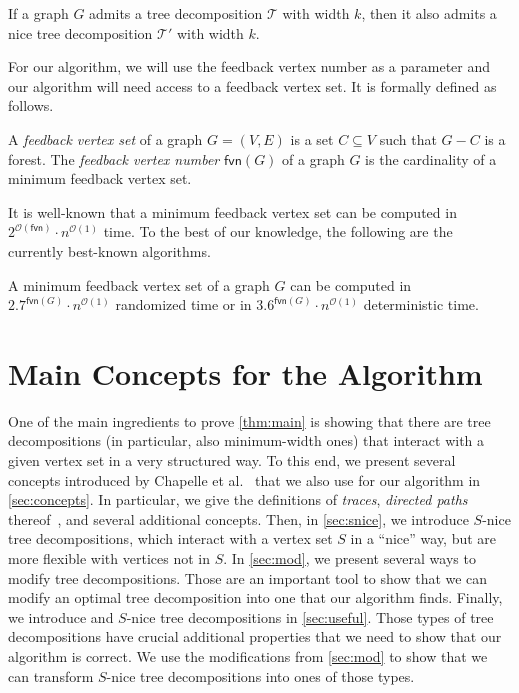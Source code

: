 \documentclass[a4paper,UKenglish,cleveref, autoref, thm-restate, numberwithinsect]{lipics-v2021}
\newcounter{modification}
\newcounter{algorithm}
\newcommand{\OO}{\mathcal{O}}
\newcommand{\fvn}{\mathsf{fvn}}
\newcommand{\slim}{\text{slim}\xspace}
\newcommand{\topheavy}{\text{top-heavy}\xspace}
\begin{document}
\begin{lemma}\label{lem:nicetd}
    If a graph $G$ admits a tree decomposition $\mathcal{T}$ with width $k$, then it also admits a nice tree decomposition $\mathcal{T}'$ with width $k$.
\end{lemma}

For our algorithm, we will use the feedback vertex number as a parameter and our algorithm will need access to a feedback vertex set. It is formally defined as follows.

\begin{definition}
    A \emph{feedback vertex set} of a graph $G=(V,E)$ is a set $C\subseteq V$ such that $G-C$ is a forest. The \emph{feedback vertex number} $\fvn(G)$ of a graph $G$ is the cardinality of a minimum feedback vertex set.
\end{definition}

It is well-known that a minimum feedback vertex set can be computed in  $2^{\OO(\fvn)}\cdot n^{\OO(1)}$ time. To the best of our knowledge, the following are the currently best-known algorithms.

\begin{theorem}\label{thm:computefvs}
    A minimum feedback vertex set of a graph $G$ can be computed in $2.7^{\fvn(G)}\cdot n^{\OO(1)}$ randomized time or in $3.6^{\fvn(G)}\cdot n^{\OO(1)}$ deterministic time.
\end{theorem}



\section{Main Concepts for the Algorithm}\label{sec:mainconcepts}
One of the main ingredients to prove \cref{thm:main} is showing that there are tree decompositions (in particular, also minimum-width ones) that interact with a given vertex set in a very structured way.  To this end, we present several concepts introduced by Chapelle et al.~\cite{chapelle2017treewidth} that we also use for our algorithm in \cref{sec:concepts}.  In particular, we give the definitions of \emph{traces}, \emph{directed paths} thereof~\cite{chapelle2017treewidth}, and several additional concepts. Then, in \cref{sec:snice}, we introduce $S$-nice tree decompositions, which interact with a vertex set $S$ in a ``nice'' way, but are more flexible with vertices not in $S$.
In \cref{sec:mod}, we present several ways to modify tree decompositions. Those are an important tool to show that we can modify an optimal tree decomposition into one that our algorithm finds. Finally, we introduce \slim and \topheavy $S$-nice tree decompositions in \cref{sec:useful}.
Those types of tree decompositions have crucial additional properties that we need to show that our algorithm is correct.
We use the modifications from \cref{sec:mod} to show that we can transform $S$-nice tree decompositions into ones of those types.
\end{document}
